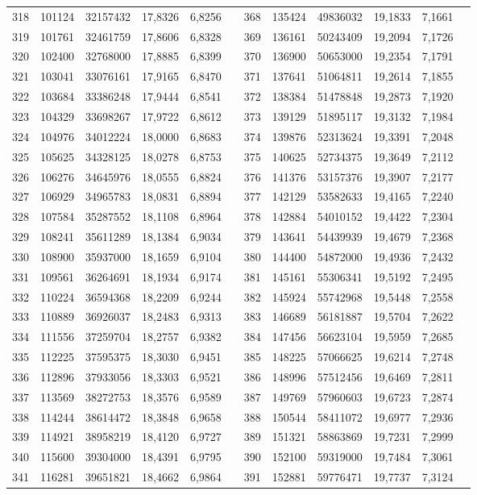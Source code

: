 \begin{longtable}{p{.17\linewidth}*{11}{S}}
318&101124&32157432&17,8326&6,8256&&368&135424&49836032&19,1833&7,1661\\
319&101761&32461759&17,8606&6,8328&&369&136161&50243409&19,2094&7,1726\\
320&102400&32768000&17,8885&6,8399&&370&136900&50653000&19,2354&7,1791\\
321&103041&33076161&17,9165&6,8470&&371&137641&51064811&19,2614&7,1855\\
322&103684&33386248&17,9444&6,8541&&372&138384&51478848&19,2873&7,1920\\
323&104329&33698267&17,9722&6,8612&&373&139129&51895117&19,3132&7,1984\\
324&104976&34012224&18,0000&6,8683&&374&139876&52313624&19,3391&7,2048\\
325&105625&34328125&18,0278&6,8753&&375&140625&52734375&19,3649&7,2112\\
326&106276&34645976&18,0555&6,8824&&376&141376&53157376&19,3907&7,2177\\
327&106929&34965783&18,0831&6,8894&&377&142129&53582633&19,4165&7,2240\\
328&107584&35287552&18,1108&6,8964&&378&142884&54010152&19,4422&7,2304\\
329&108241&35611289&18,1384&6,9034&&379&143641&54439939&19,4679&7,2368\\
330&108900&35937000&18,1659&6,9104&&380&144400&54872000&19,4936&7,2432\\
331&109561&36264691&18,1934&6,9174&&381&145161&55306341&19,5192&7,2495\\
332&110224&36594368&18,2209&6,9244&&382&145924&55742968&19,5448&7,2558\\
333&110889&36926037&18,2483&6,9313&&383&146689&56181887&19,5704&7,2622\\
334&111556&37259704&18,2757&6,9382&&384&147456&56623104&19,5959&7,2685\\
335&112225&37595375&18,3030&6,9451&&385&148225&57066625&19,6214&7,2748\\
336&112896&37933056&18,3303&6,9521&&386&148996&57512456&19,6469&7,2811\\
337&113569&38272753&18,3576&6,9589&&387&149769&57960603&19,6723&7,2874\\
338&114244&38614472&18,3848&6,9658&&388&150544&58411072&19,6977&7,2936\\
339&114921&38958219&18,4120&6,9727&&389&151321&58863869&19,7231&7,2999\\
340&115600&39304000&18,4391&6,9795&&390&152100&59319000&19,7484&7,3061\\
341&116281&39651821&18,4662&6,9864&&391&152881&59776471&19,7737&7,3124\\

\end{longtable}
